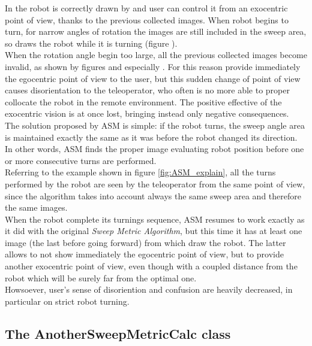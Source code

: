 In  the robot is correctly drawn by \framework{}
and user can control it from an exocentric point of view, thanks to
the previous collected images. When robot begins to turn, for narrow
angles of rotation the images are still included in the sweep area, so
\framework{} draws the robot while it is turning (figure
).
\\
When the rotation angle begin too large, all the previous collected images
become invalid, as shown by figures  and
especially . For this reason \framework{} provide
immediately the egocentric point of view to the user, but this sudden change
of point of view causes disorientation to the teleoperator, who often is
no more able to proper collocate the robot in the remote environment. The
positive effective of the exocentric vision is at once lost, bringing
instead only negative consequences.
\\
The solution proposed by ASM is simple: if the robot turns, the sweep angle
area is maintained exactly the same as it was before the robot changed
its direction. In other words, ASM finds the proper image evaluating robot
position before one or more consecutive turns are performed.
\\
Referring to the example shown in figure \ref{fig:ASM_explain}, all the
turns performed by the robot are seen by the teleoperator from the same
point of view, since the algorithm takes into account always the same
sweep area and therefore the same images.
\\
When the robot complete its turnings sequence, ASM resumes to
work exactly as it did with the original \textit{Sweep Metric Algorithm},
but this time it has at least one image (the last before going forward)
from which draw the robot. The latter allows \framework{} to not show
immediately the egocentric point of view, but to provide another exocentric
point of view, even though with a coupled distance from the robot which
will be surely far from the optimal one.
\\
Howsoever, user's sense of disoriention and confusion are heavily decreased,
in particular on strict robot turning.

\subsection{The AnotherSweepMetricCalc class}
\label{concr:iimageselector:another_sweep_metric_class}

